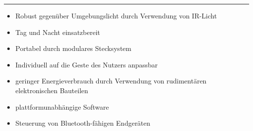 \documentclass[a4paper,12pt,notumble]{leaflet}
\begin{document}
\textcolor{rwth-lblue}{\noindent\rule{\textwidth}{4pt}}

\noindent
\begin{minipage}[c][0.32\textheight][t]{\textwidth}
	\begin{itemize}
		\item Robust gegenüber Umgebungslicht durch Verwendung von IR-Licht 
		\item Tag und Nacht einsatzbereit
		\item Portabel durch modulares Stecksystem
		\item Individuell auf die Geste des Nutzers anpassbar
		\item geringer Energieverbrauch durch Verwendung von rudimentären elektronischen Bauteilen
		\item plattformunabhängige Software
		\item Steuerung von Bluetooth-fähigen Endgeräten
	\end{itemize}
\end{minipage}

\clearpage


\end{document}
